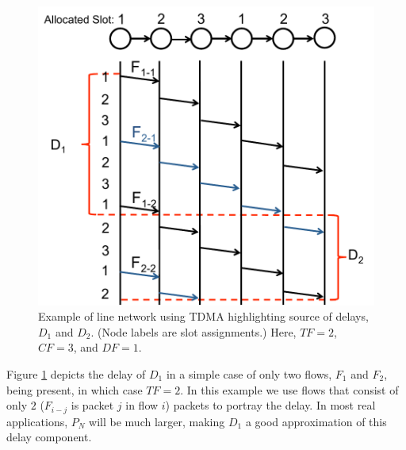 \begin{figure}
\begin{centering}
    \includegraphics[scale=0.33]{figures/delay_limit_expl/fig_1_2.pdf}
    \caption{Example of line network using TDMA highlighting source of delays, $D_1$ and $D_2$.  (Node labels are slot assignments.)  Here, $TF = 2$, $CF = 3$, and $DF = 1$. }
    \label{fig:delay_expl_fig_3}
\end{centering}
\end{figure}

Figure \ref{fig:delay_expl_fig_3} depicts the delay of $D_1$ in a simple case of only two flows, $F_1$ and $F_2$, being present, in which case $TF = 2$.  In this example we use flows that consist of only $2$ ($F_{i-j}$ is packet $j$ in flow $i$) packets to portray the delay.  In most real applications, $P_N$ will be much larger, making $D_1$ a good approximation of this delay component.

